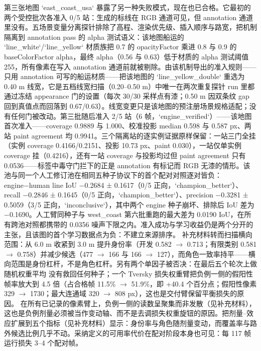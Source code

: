 \documentclass[journal]{IEEEtran}
\begin{document}
第三张地图 `east_coast_usa` 暴露了另一种失败模式，现在也已合格。它最初的两个受控批次各准入 0/5 站：生成的标线在 RGB 通道可见，但 annotation 通道里没有。五场景变量分离探针排除了高程、渲染优先级、插入顺序与路宽，把机制隔离到 annotation pass 的 alpha 测试语义：该地图船运的 `line_white`/`line_yellow` 材质族把 0.7 的 opacityFactor 乘进 0.8 与 0.9 的 baseColorFactor alpha，最终 alpha（0.56 与 0.63）低于材质的 alpha 测试阈值 255，所有像素在写入 annotation 通道前就被剔除。由该机制导出的准入规则------只用 annotation 可写的船运材质------把该地图的 `line_yellow_double` 重选为 0.40 m 线宽，它是五档线宽扫描（0.20--0.50 m）中唯一在两次重复探针 run 里都通过冻结 appearance 门的设置（每次 30/30 采样点有漆；0.50 m 因双条纹 gap 回到真值点而回落到 0.67/0.63）。线宽变更只是该地图的预注册场景规格适配；没有任何门被改动。第三批随后准入 2/5 站（6 帧，`engine_verified`）------该地图首次准入------coverage 0.9889 与 1.000、校准投影 median 0.598 与 0.587 px、两站 paint agreement 均 0.9941。三个隔离站的逐实例证据原样保留：一站三门全挂（实例 coverage 0.4166/0.2151、投影 10.73 px、paint 0.030），一站仅单实例 coverage 挂（0.4216），还有一站 coverage 与投影均过但 paint agreement 只有 0.0536------标签中毒守门拦下的正是 annotation 有标记而 RGB 无漆的情形。该池与同一个人工修订池在相同五种子协议下的首个配对对照逐对皆负：engine−human line IoU −0.2684 ± 0.1617（0/5 正向，`champion_better`）、recall −0.2846 ± 0.1645（0/5 正向，`champion_better`）、precision −0.3281 ± 0.5059（3/5 正向，`inconclusive`），其中两个 engine 种子崩坏、排除后 IoU 差为 −0.1690。人工臂同种子与 west_coast 第六批重跑的最大差为 0.0190 IoU，在所有跨池对照都携带的 0.0356 噪声下限之内。准入成功与学习收益仍是两个分开的主张，且该图的首个学习数据点为负：不建立来源排序。
补充材料转而扫描横向范围：从 6.0 m 收紧到 3.0 m 提升身份率（开发 0.582 $\rightarrow$ 0.713；有限类别 0.581 $\rightarrow$ 0.758）并减少候选（477 $\rightarrow$ 166 与 166 $\rightarrow$ 127），而角色一致率持平------横向范围是身份杠杆，不是角色杠杆。另有两个单因子被否决：在最后五个轮次上做随机权重平均 \cite{izmailov2018swa} 没有救回任何种子；一个 Tversky 损失权重臂把负例一侧的假阳性帧率放大到 4.5 倍（占合格帧 11.5\% $\rightarrow$ 51.9\%，即 +40.4 个百分点；假阳性像素 329 $\rightarrow$ 1730；最大连通域 320 $\rightarrow$ 808 px），这也是交付臂保留平衡损失的原因。
在所有已记录的像素臂上，负例一侧的读数呈聚集而非发散（见补充材料），这也是负例剂量必须被当作变动轴、而不是去调损失权重旋钮的原因。把剂量--效应扩展到五个指标（见补充材料）显示：身份率与角色随剂量变动，而覆盖率与路外候选比例几乎不动。采纳定义的可用率代价在配对阶段本身也可见：每 117 帧运行损失 3--4 个配对帧。
\end{document}

